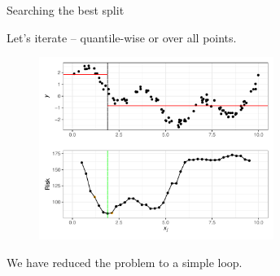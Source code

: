\documentclass[11pt,compress,t,notes=noshow, xcolor=table]{beamer}
\begin{document}
\begin{vbframe}{Searching the best split}

Let's iterate -- quantile-wise or over all points.
\begin{figure}
\includegraphics[width=0.68\textwidth]{figure/splitcrit_optimal-constant-grid2.pdf} 
\end{figure}

We have reduced the problem to a simple loop.

\end{vbframe}
\end{document}
